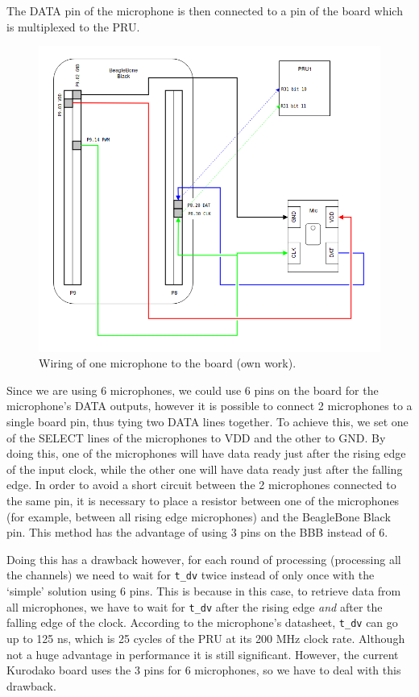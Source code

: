 \documentclass[]{report}
\begin{document}
The DATA pin of the microphone is then connected to a pin of the board which is multiplexed to the PRU.

\begin{figure}[H]
\centering
\includegraphics[width=0.6\linewidth]{Pictures/wiring.png}
\caption{Wiring of one microphone to the board (own work).}
\end{figure}

Since we are using 6 microphones, we could use 6 pins on the board for the microphone's DATA outputs, however it is possible to connect 2 microphones to a single board pin, thus tying two DATA lines together. To achieve this, we set one of the SELECT lines of the microphones to VDD and the other to GND. By doing this, one of the microphones will have data ready just after the rising edge of the input clock, while the other one will have data ready just after the falling edge. In order to avoid a short circuit between the 2 microphones connected to the same pin, it is necessary to place a resistor between one of the microphones (for example, between all rising edge microphones) and the BeagleBone Black pin. This method has the advantage of using 3 pins on the BBB instead of 6.

Doing this has a drawback however, for each round of processing (processing all the channels) we need to wait for \texttt{t\_dv} twice instead of only once with the `simple' solution using 6 pins. This is because in this case, to retrieve data from all microphones, we have to wait for \texttt{t\_dv} after the rising edge \emph{and} after the falling edge of the clock. According to the microphone's datasheet, \texttt{t\_dv} can go up to 125 ns, which is 25 cycles of the PRU at its 200 MHz clock rate. Although not a huge advantage in performance it is still significant. However, the current Kurodako board uses the 3 pins for 6 microphones, so we have to deal with this drawback.
\end{document}
